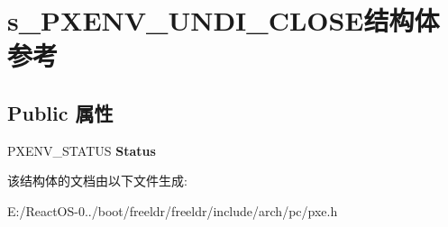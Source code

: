 \hypertarget{structs___p_x_e_n_v___u_n_d_i___c_l_o_s_e}{}\section{s\+\_\+\+P\+X\+E\+N\+V\+\_\+\+U\+N\+D\+I\+\_\+\+C\+L\+O\+S\+E结构体 参考}
\label{structs___p_x_e_n_v___u_n_d_i___c_l_o_s_e}
\subsection*{Public 属性}
\begin{DoxyCompactItemize}
\item 
\mbox{\label{structs___p_x_e_n_v___u_n_d_i___c_l_o_s_e_a811ac368bb27ddce8f5149464a989ead}} 
P\+X\+E\+N\+V\+\_\+\+S\+T\+A\+T\+US {\bfseries Status}
\end{DoxyCompactItemize}


该结构体的文档由以下文件生成\+:\begin{DoxyCompactItemize}
\item 
E\+:/\+React\+O\+S-\/0../boot/freeldr/freeldr/include/arch/pc/pxe.\+h\end{DoxyCompactItemize}
